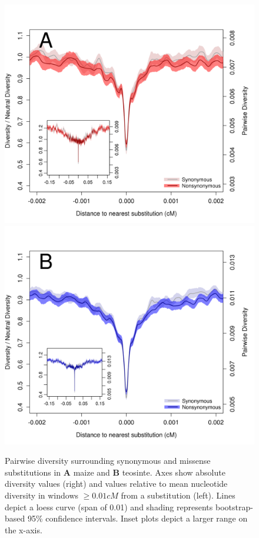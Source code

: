 \documentclass{pnastwo}
\begin{document}
\begin{article}
\begin{figure}
\centering
\includegraphics[width=.45\textwidth]{FigsAndFiles/plotDiversity_TvM_Folded2_Significance_Aug}
\hspace{0.05\textwidth} \includegraphics[width=.45\textwidth]{FigsAndFiles/plotDiversity_TvT_Folded2_Significance_Aug}
\caption{Pairwise diversity surrounding synonymous and \DIFdelbeginFL {}\DIFdelendFL missense  \DIFdelbeginFL \DIFdelFL{)
  }\DIFdelendFL substitutions in {\bf A} maize and {\bf B} teosinte. Axes show \DIFdelbeginFL {}\DIFdelendFL absolute diversity values (\DIFdelbeginFL {}\DIFdelendFL right) and values relative to mean nucleotide diversity in windows $\geq 0.01 cM$ from a substitution (\DIFdelbeginFL {}\DIFdelendFL left).  Lines depict a loess curve (span of 0.01) and shading represents bootstrap-based 95\% confidence intervals. Inset plots depict a larger range on the x-axis. \label{fig:hardSweeps}}
\end{figure}


\end{article}
\end{document}
